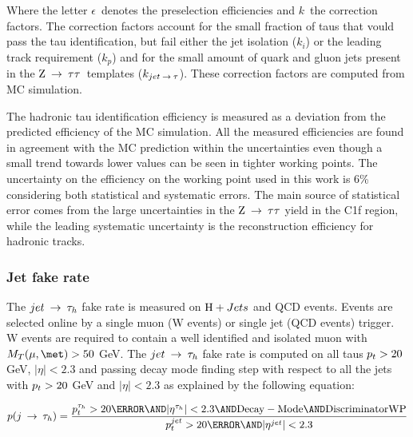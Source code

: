 Where the letter $\epsilon$\ denotes the preselection efficiencies and $k$\ the correction factors. The correction factors account for the small fraction of taus that vould pass the tau identification, but fail either the jet isolation ($k_i$) or the leading track requirement ($k_p$) and for the small amount of quark and gluon jets present in the $\mathrm{Z}\:\rightarrow\:\tau\tau$\ templates ($k_{jet \:\rightarrow\: \tau}$). These correction factors are computed from MC simulation. 

The hadronic tau identification efficiency is measured as a deviation from the predicted efficiency of the MC simulation. All the measured efficiencies are found in agreement with the MC prediction within the uncertainties even though a small trend towards lower values can be seen in tighter working points. The uncertainty on the efficiency on the working point used in this work is 6\% considering both statistical and systematic errors. The main source of statistical error comes from the large uncertainties in the $\mathrm{Z}\:\rightarrow\:\tau\tau$ yield in the C1f region, while the leading systematic uncertainty is the reconstruction efficiency for hadronic tracks.

\subsubsection*{Jet fake rate}

The $jet \:\rightarrow\: \tau_h$ fake rate is measured on $\mathrm{H}+Jets$ and QCD events. Events are selected online by a single muon (W events) or single jet (QCD events) trigger. W events are required to contain a well identified and isolated muon with $M_T(\mu, \met) > 50$ GeV. The $jet \:\rightarrow\: \tau_h$ fake rate is computed on all taus $p_{t} > 20$ GeV, $|\eta| < 2.3$ and passing decay mode finding step with respect to all the jets with $p_{t} > 20$ GeV and $|\eta| < 2.3$ as explained by the following equation:

\begin{equation}
 p(j \To \tau_h) = \dfrac{\pt^{\tau_h} > 20\GeV \AND |\eta^{\tau_h}| < 2.3 \AND \mathrm{Decay-Mode} \AND \mathrm{Discriminator WP}}{\pt^{jet} > 20\GeV \AND |\eta^{jet}| < 2.3}
\end{equation}

